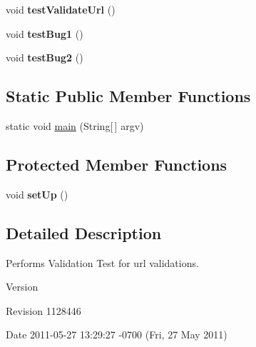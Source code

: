 \begin{DoxyCompactItemize}
\item 
void {\bfseries test\+Validate\+Url} ()\hypertarget{classUrlValidatorTest_a5f7eb3f32ec8d3930a4adc0336fe4fb5}{}\label{classUrlValidatorTest_a5f7eb3f32ec8d3930a4adc0336fe4fb5}

\item 
void {\bfseries test\+Bug1} ()\hypertarget{classUrlValidatorTest_ab17a4f4f06fa8f86d2a9775e6fd35824}{}\label{classUrlValidatorTest_ab17a4f4f06fa8f86d2a9775e6fd35824}

\item 
void {\bfseries test\+Bug2} ()\hypertarget{classUrlValidatorTest_aa40ccf3b2c1b5abaca832277b9d8813a}{}\label{classUrlValidatorTest_aa40ccf3b2c1b5abaca832277b9d8813a}

\end{DoxyCompactItemize}
\subsection*{Static Public Member Functions}
\begin{DoxyCompactItemize}
\item 
static void \hyperlink{classUrlValidatorTest_adff7e7d470a0fbb3b2fd3b7c68cc576b}{main} (String\mbox{[}$\,$\mbox{]} argv)
\end{DoxyCompactItemize}
\subsection*{Protected Member Functions}
\begin{DoxyCompactItemize}
\item 
void {\bfseries set\+Up} ()\hypertarget{classUrlValidatorTest_ab8ae778c8c9d8b1699e48a7a5b7c6606}{}\label{classUrlValidatorTest_ab8ae778c8c9d8b1699e48a7a5b7c6606}

\end{DoxyCompactItemize}


\subsection{Detailed Description}
Performs Validation Test for url validations.

\begin{DoxyVersion}{Version}

\end{DoxyVersion}
\begin{DoxyParagraph}{Revision}
1128446 
\end{DoxyParagraph}
\begin{DoxyParagraph}{Date}
2011-\/05-\/27 13\+:29\+:27 -\/0700 (Fri, 27 May 2011) 
\end{DoxyParagraph}


